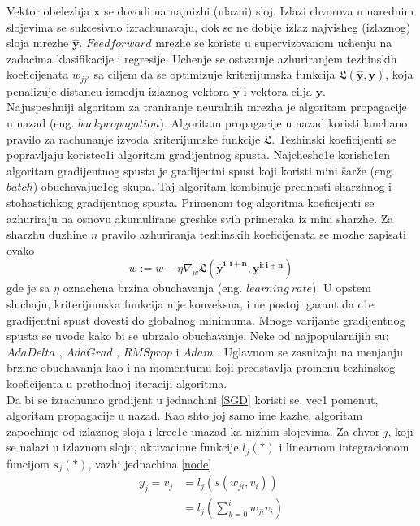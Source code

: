\documentclass[a4paper, openany, oneside, 11pt]{book}
\begin{document}
Vektor obelezhja $\mathbf{x}$ se dovodi na najnizhi (ulazni) sloj. Izlazi chvorova u narednim slojevima se sukcesivno izrachunavaju, dok se ne dobije izlaz najvisheg (izlaznog) sloja mrezhe $\mathbf{\hat{y}}$. $Feedforward$ mrezhe se koriste u supervizovanom uchenju na zadacima klasifikacije i regresije. Uchenje se ostvaruje azhuriranjem tezhinskih koeficijenata $w_{jj'}$ sa ciljem da se optimizuje kriterijumska funkcija $\mathfrak{L}(\mathbf{\hat{y}}, \mathbf{y})$, koja penalizuje distancu izmedju izlaznog vektora $\mathbf{\hat{y}}$ i vektora cilja $\mathbf{y}$.\\
Najuspeshniji algoritam za traniranje neuralnih mrezha je algoritam propagacije u nazad (eng. $backpropagation$)\cite{Backprog}. Algoritam propagacije u nazad koristi lanchano pravilo za rachunanje izvoda kriterijumske funkcije $\mathfrak{L}$. Tezhinski koeficijenti se popravljaju koristec1i algoritam gradijentnog spusta. Najchesh\-c1e korish\-c1en algoritam gradijentnog spusta je gradijentni spust koji koristi mini šarže (eng. $batch$) obuchavajuc1eg skupa. Taj algoritam kombinuje prednosti sharzhnog i stohastichkog gradijentnog spusta. Primenom tog algoritma koeficijenti se azhuriraju na osnovu akumulirane greshke svih primeraka iz mini sharzhe. Za sharzhu duzhine $n$ pravilo azhuriranja tezhinskih koeficijenata se mozhe zapisati ovako
\begin{equation}\label{SGD}
w := w- \eta\nabla_w\mathfrak{L}\left(\mathbf{\hat{y}^{i:i+n}}, \mathbf{y^{i:i+n}}\right)
\end{equation}
gde je sa $\eta$ oznachena brzina obuchavanja (eng. $learning\ rate$).
U opstem sluchaju, kriterijumska funkcija nije konveksna, i ne postoji garant da c1e gradijentni spust dovesti do globalnog minimuma. Mnoge varijante gradijentnog spusta se uvode kako bi se ubrzalo obuchavanje. Neke od najpopularnijih su: $AdaDelta$ \cite{AdaDelta}, $AdaGrad$ \cite{AdaGrad}, $RMSprop$ \cite{RMSprop} i $Adam$ \cite{Adam}. Uglavnom se zasnivaju na menjanju brzine obuchavanja kao i na momentumu koji predstavlja promenu tezhinskog koeficijenta u prethodnoj iteraciji algoritma.\\
Da bi se izrachunao gradijent u jednachini \ref{SGD} koristi se, vec1 pomenut, algoritam propagacije u nazad. Kao shto joj samo ime kazhe, algoritam zapochinje od izlaznog sloja i krec1e unazad ka nizhim slojevima. 
Za chvor $j$, koji se nalazi u izlaznom sloju, aktivacione funkcije $l_j(*)$ i linearnom integracionom funcijom $s_j(*)$, vazhi jednachina \ref{node}
\begin{align}
y_j=v_j &= l_j\left(s(w_{ji},v_i)\right)\\
&=l_j\left(\sum^{i}_{k=0}w_{ji}v_i\right)
\end{align}
\end{document}
